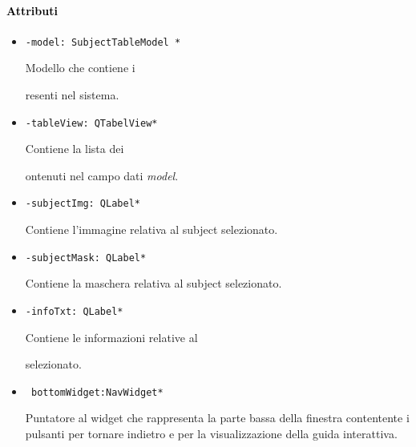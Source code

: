 \paragraph{\textcolor{black}{Attributi\\}}
\begin{itemize}
\item\color{teal}\verb!-model: SubjectTableModel *!

\color{black}Modello che contiene i \subject presenti nel sistema.

\item\color{teal}\verb!-tableView: QTabelView*!
\color{black}

Contiene la lista dei \subject contenuti nel campo dati \emph{model}.

\item\color{teal}\verb!-subjectImg: QLabel*!
\color{black}

Contiene l'immagine relativa al subject\g{} selezionato.

\item\color{teal}\verb!-subjectMask: QLabel*!

\color{black}
Contiene la maschera relativa al subject\g{} selezionato.

\item\color{teal}\verb!-infoTxt: QLabel*!

\color{black}
Contiene le informazioni relative al \subject{} selezionato.

\item\color{teal}\verb! bottomWidget:NavWidget*!
\color{black} 

Puntatore al widget che rappresenta la parte bassa della finestra contentente i pulsanti per tornare indietro e per la visualizzazione della guida interattiva.
\end{itemize}
